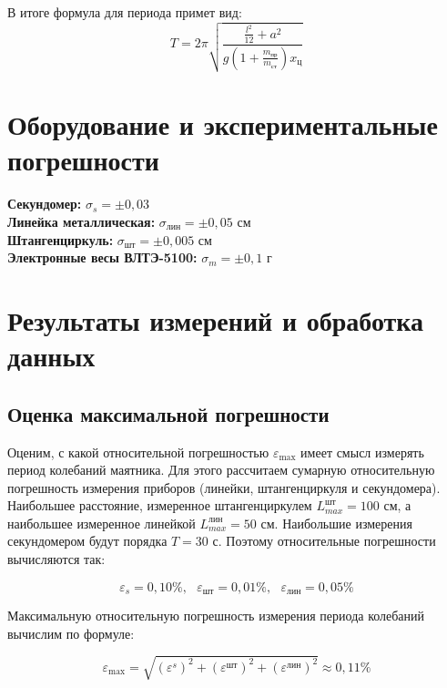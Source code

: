\documentclass[a4paper,12pt]{article}
\begin{document}
\noindent
В итоге формула для периода примет вид:
\begin{equation}\label{eq11}
T = 2\pi \sqrt{\frac{\frac{l^2}{12} + a^2}{g (1+\frac{m_{\text{пр}}}{m_{\text{ст}}})x_{\text{ц}}}}
\end{equation}

\section{Оборудование и экспериментальные погрешности}

\textbf{Секундомер:} $\sigma_s = \pm 0,03$ \\ 
\textbf{Линейка металлическая:} $\sigma_\text{лин} = \pm 0,05$ см \\
\textbf{Штангенциркуль:} $\sigma_\text{шт} = \pm 0,005$ см \\
\textbf{Электронные весы ВЛТЭ-5100:} $\sigma_m = \pm 0,1$ г \\

\section{Результаты измерений и обработка данных}
\subsection{Оценка максимальной погрешности}

Оценим, с какой относительной погрешностью $\varepsilon_\text{max}$ имеет смысл измерять период колебаний маятника. Для этого рассчитаем сумарную относительную погрешность измерения приборов (линейки, штангенциркуля и секундомера).\\

Наибольшее расстояние, измеренное штангенциркулем $L^\text{шт}_{max} = 100$ см, а наибольшее измеренное линейкой $L^\text{лин}_{max} = 50$ см. Наибольшие измерения секундомером будут порядка $T = 30$ с. Поэтому относительные погрешности вычисляются так:

\begin{equation}
    \varepsilon_s = 0,10 \%, \text{        } \varepsilon_\text{шт} = 0,01 \%, \text{        }  \varepsilon_\text{лин} = 0,05 \%
\end{equation}

Максимальную относительную погрешность измерения периода колебаний вычислим по формуле:

\begin{equation}
    \varepsilon_\text{max} = \sqrt{ (\varepsilon^s) ^ 2 + (\varepsilon^\text{шт}) ^ 2 + (\varepsilon^\text{лин}) ^ 2} \approx 0,11 \%
\end{equation}
\end{document}

